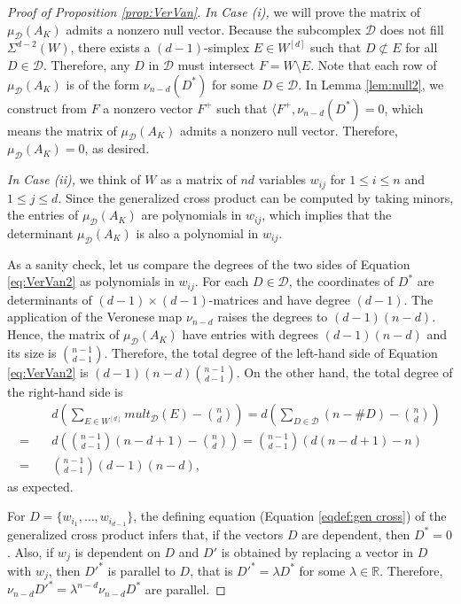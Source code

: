 \documentclass{article}
\begin{document}
\begin{proof}[Proof of Proposition \ref{prop:VerVan}]

   
    
    \textit{In Case (i),} we will prove the matrix of $\mu_\mathcal{D} (A_K)$ admits a nonzero null vector. Because the subcomplex $\mathcal{D}$ does not fill $\Sigma^{d-2}(W)$, there exists a $(d-1)$-simplex $E \in W^{[d]}$ such that $D \not\subset E$ for all $D \in \mathcal{D}$. Therefore, any $D$ in $\mathcal{D}$ must intersect $F = W \setminus E$. Note that each row of $\mu_\mathcal{D} (A_K)$ is of the form $\nu_{n-d}(D^*)$ for some $D \in \mathcal{D}$. In Lemma \ref{lem:null2}, we construct from $F$ a nonzero vector $F^+$ such that $\langle F^+, \nu_{n-d}(D^*) = 0$, which means the matrix of $\mu_\mathcal{D} (A_K)$ admits a nonzero null vector. Therefore, $\mu_\mathcal{D} (A_K) = 0$, as desired.
    
    \textit{In Case (ii),} we think of $W$ as a matrix of $nd$ variables $w_{ij}$ for $1 \leq i \leq n$ and $1 \leq j \leq d$. Since the generalized cross product can be computed by taking minors, the entries of $\mu_\mathcal{D} (A_K)$ are polynomials in $w_{ij}$, which implies that the determinant $\mu_\mathcal{D} (A_K)$ is also a polynomial in $w_{ij}$.
     
    As a sanity check, let us compare the degrees of the two sides of Equation \ref{eq:VerVan2} as polynomials in $w_{ij}$. For each $D \in \mathcal{D}$, the coordinates of $D^*$ are determinants of $(d-1) \times (d-1)$-matrices and have degree $(d-1)$. The application of the Veronese map $\nu_{n-d}$ raises the degrees to $(d-1)(n-d)$. Hence, the matrix of $\mu_\mathcal{D} (A_K)$ have entries with degrees $(d-1)(n-d)$ and its size is $\binom{n-1}{d-1}$. Therefore, the total degree of the left-hand side of Equation \ref{eq:VerVan2} is $(d-1)(n-d)\binom{n-1}{d-1}$. On the other hand, the total degree of the right-hand side is
   	\begin{align*}
   		&d \left( \sum_{E \in W^{[d]}} mult_\mathcal{D}(E) - \binom{n}{d} \right) = d \left( \sum_{D \in \mathcal{D}} (n - \# D) - \binom{n}{d} \right) \\
        =\quad & d \left( \binom{n-1}{d-1} (n-d+1) - \binom{n}{d} \right) = \binom{n-1}{d-1} (d(n-d+1) - n) \\
        =\quad & \binom{n-1}{d-1} (d-1) (n-d),
   	\end{align*} 
as expected.
    
    
    
    For $D = \{w_{i_1}, \dots, w_{i_{d-1}}\}$, the defining equation (Equation \ref{eqdef:gen cross}) of the generalized cross product infers that, if the vectors $D$ are dependent, then $D^* = 0$. Also, if $w_j$ is dependent on $D$ and $D'$ is obtained by replacing a vector in $D$ with $w_j$, then $D'^*$ is parallel to $D$, that is $D'^* = \lambda D^*$ for some $\lambda \in \mathbb{R}$. Therefore, $\nu_{n-d} D'^* = \lambda^{n-d} \nu_{n-d} D^*$ are parallel.
    

\end{proof}
\end{document}
